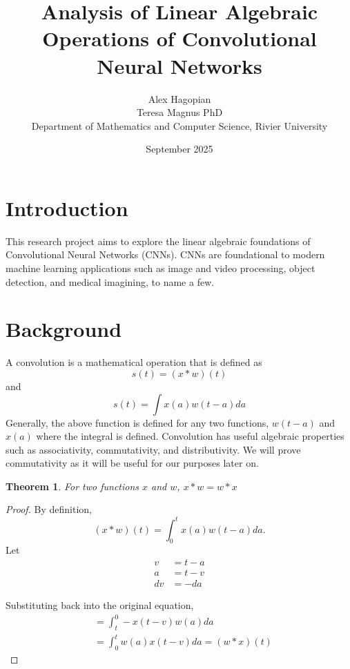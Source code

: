 \documentclass[12pt]{article}
\title{Analysis of Linear Algebraic Operations of Convolutional Neural Networks}
\author{Alex Hagopian \\Teresa Magnus PhD \\ Department of Mathematics and Computer Science, Rivier University}
\date{September 2025}
\newtheorem{theorem}{Theorem}
\begin{document}
\maketitle

\begin{abstract}

\end{abstract}
\section*{Introduction}
This research project aims to explore the linear algebraic 
foundations of Convolutional Neural Networks (CNNs). CNNs are foundational 
to modern machine learning applications such as image and video processing,
object detection, and medical imagining, to name a few.

\section*{Background}
A convolution is a mathematical operation that is defined as
\begin{equation}
    s(t) = (x \ast w)(t)
\end{equation}
and
\begin{equation}
    s(t)=\int x(a) w(t-a) da
\end{equation}
Generally, the above function is defined for any two functions, $w(t-a)$ and $x(a)$ where the integral is defined. \cite{Goodfellow-et-al-2016}
Convolution has useful algebraic properties such as associativity, commutativity, and distributivity. We will prove commutativity as it will be useful for our purposes later on.

\begin{theorem}
    For two functions $x$ and $w$, $x \ast w= w \ast x$
\end{theorem}
\begin{proof}
 By definition, 
 \begin{equation*}
     (x * w)(t) = \int_{0}^{t} x(a)w(t-a)da. 
 \end{equation*}
 Let 
 \begin{align*}
     v &= t-a \\
     a &= t-v \\
     dv &= -da
 \end{align*}
     
 Substituting back into the original equation,
 \begin{align*}
     & =\int_{t}^0-x(t-v)w(a)da \\
     & =\int_0^tw(a)x(t-v)da = (w*x)(t)
 \end{align*}
\end{proof}
\end{document}
